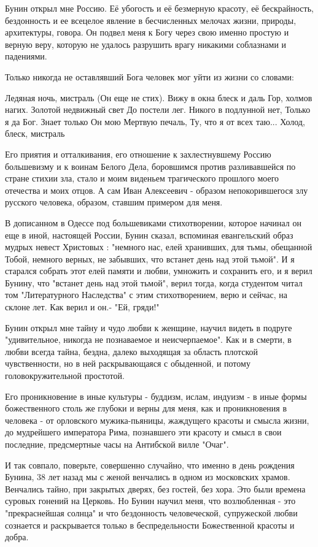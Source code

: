 Бунин открыл мне Россию. Её убогость и её безмерную красоту, её бескрайность,
бездонность и ее всецелое явление в бесчисленных мелочах жизни, природы,
архитектуры, говора. Он подвел меня к Богу через свою именно простую и верную
веру, которую не удалось разрушить врагу никакими соблазнами и падениями.

Только никогда не оставлявший Бога человек мог уйти из жизни со словами:

Ледяная ночь, мистраль
(Он еще не стих).
Вижу в окна блеск и даль
Гор, холмов нагих.
Золотой недвижный свет
До постели лег.
Никого в подлунной нет,
Только я да Бог.
Знает только Он мою
Мертвую печаль,
Ту, что я от всех таю...
Холод, блеск, мистраль

Его приятия и отталкивания, его отношение к захлестнувшему Россию большевизму и
к воинам Белого Дела, боровшимся против разливавшейся по стране стихии зла,
стало и моим виденьем трагического прошлого моего отечества и моих отцов. А сам
Иван Алексеевич - образом непокорившегося злу русского человека, образом,
ставшим примером для меня.

В дописанном в Одессе под большевиками стихотворении, которое начинал он еще в
иной, настоящей России, Бунин сказал, вспоминая евангельский образ мудрых
невест Христовых : "немного нас, елей хранивших, для тьмы, обещанной Тобой,
немного верных, не забывших, что встанет день над этой тьмой". И я старался
собрать этот елей памяти и любви, умножить и сохранить его, и я верил Бунину,
что "встанет день над этой тьмой", верил тогда, когда студентом читал том
"Литературного Наследства" с этим стихотворением, верю и сейчас, на склоне лет.
Как верил и он.- "Ей, гряди!"

Бунин открыл мне тайну и чудо любви к женщине, научил видеть в подруге
"удивительное, никогда не познаваемое и неисчерпаемое". Как и в смерти, в любви
всегда тайна, бездна, далеко выходящая за область плотской чувственности, но в
ней раскрывающаяся с обыденной, и потому головокружительной простотой.

Его проникновение в иные культуры - буддизм, ислам, индуизм - в иные формы
божественного столь же глубоки и верны для меня, как и проникновения в человека
- от орловского мужика-пьяницы, жаждущего красоты и смысла жизни, до мудрейшего
императора Рима, познавшего эти красоту и смысл в свои последние, предсмертные
часы на Антибской вилле "Очаг".

И так совпало, поверьте, совершенно случайно, что именно в день рождения
Бунина, 38 лет назад мы с женой венчались в одном из московских храмов.
Венчались тайно, при закрытых дверях, без гостей, без хора. Это были времена
суровых гонений на Церковь. Но Бунин научил меня, что возлюбленная - это
"прекраснейшая солнца" и что бездонность человеческой, супружеской любви
сознается и раскрывается только в беспредельности Божественной красоты и добра.

